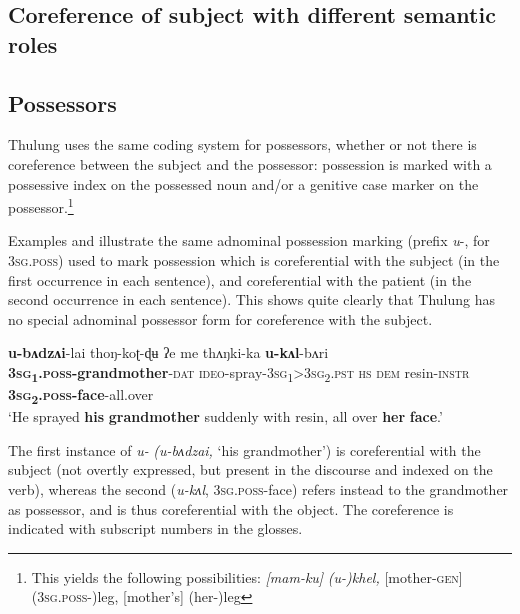 \documentclass[output=paper]{langscibook}
\begin{document}
\subsection{Coreference of subject with different semantic roles}
\label{sec:Lahaussois:5}
\subsection{Possessors}
\label{sec:Lahaussois:5.1}

Thulung uses the same coding system for possessors, whether or not there is coreference between the subject and the possessor: possession is marked with a possessive index on the possessed noun and/or a genitive case marker on the possessor.\footnote{This yields the following possibilities: \textit{[mam-ku]} \textit{(u-)khel,} [mother-\textsc{gen}] (3\textsc{sg}.\textsc{poss}-)leg, [mother's] (her-)leg}  

Examples  and  illustrate the same adnominal possession marking (prefix \textit{u}{}-, for 3\textsc{sg.poss}) used to mark possession which is coreferential with the subject (in the first occurrence in each sentence), and coreferential with the patient (in the second occurrence in each sentence). This shows quite clearly that Thulung has no special adnominal possessor form for coreference with the subject. 

\ea%
    \label{ex:Lahaussois:30}
    \gll \textbf{u-bʌdzʌi}{}-lai thoŋ-koʈ-ɖʉ ʔe me thʌŋki-ka \textbf{u-kʌl}{}-bʌri\\
        \textbf{\textsc{3sg}}\textbf{\textsc{\textsubscript{1}}}\textbf{\textsc{.poss}}\textbf{{}-grandmother}{}-\textsc{dat} \textsc{ideo}{}-spray-\textsc{3sg}\textsc{\textsubscript{1}}\textsc{>3sg}\textsc{\textsubscript{2}}\textsc{.pst} \textsc{hs} \textsc{dem} resin-\textsc{instr} \textbf{\textsc{3sg}}\textbf{\textsc{\textsubscript{2}}}\textbf{\textsc{.poss}}\textbf{{}-face}{}-all.over\\
    \glt ‘He sprayed \textbf{his} \textbf{grandmother} suddenly with resin, all over \textbf{her} \textbf{face}.'
    \z

The first instance of \textit{u-} \textit{(u-bʌdzai,} ‘his grandmother') is coreferential with the subject (not overtly expressed, but present in the discourse and indexed on the verb), whereas the second (\textit{u-kʌl}, \textsc{3sg.poss}{}-face) refers instead to the grandmother as possessor, and is thus coreferential with the object. The coreference is indicated with subscript numbers in the glosses.
\end{document}
